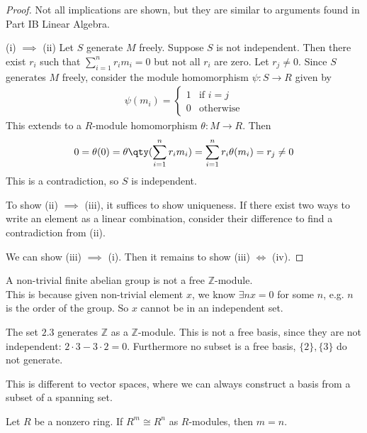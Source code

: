 \begin{proof}
	Not all implications are shown, but they are similar to arguments found in Part IB Linear Algebra.

	(i) $\implies$ (ii)
	Let $S$ generate $M$ freely.
	Suppose $S$ is not independent.
	Then there exist $r_i$ such that $\sum_{i=1}^n r_i m_i = 0$ but not all $r_i$ are zero.
	Let $r_j \neq 0$.
	Since $S$ generates $M$ freely, consider the module homomorphism $\psi : S \to R$ given by
	\begin{align*}
		\psi(m_i) = \begin{cases}
			1 & \text{if } i = j \\
			0 & \text{otherwise}
		\end{cases}
	\end{align*}
	This extends to a $R$-module homomorphism $\theta : M \to R$.
	Then
	\begin{align*}
		0 = \theta(0) = \theta\qty(\sum_{i=1}^n r_i m_i) = \sum_{i=1}^n r_i \theta(m_i) = r_j \neq 0
	\end{align*}
	This is a contradiction, so $S$ is independent.

	To show (ii) $\implies$ (iii), it suffices to show uniqueness.
	If there exist two ways to write an element as a linear combination, consider their difference to find a contradiction from (ii).

	We can show (iii) $\implies$ (i).
	Then it remains to show (iii) $\iff$ (iv).
\end{proof}

\begin{example}
	A non-trivial finite abelian group is not a free $\mathbb Z$-module. \\
	This is because given non-trivial element $x$, we know $\exists nx = 0$ for some $n$, e.g. $n$ is the order of the group.
	So $x$ cannot be in an independent set.
\end{example}

\begin{example}
	The set $\qty{2,3}$ generates $\mathbb Z$ as a $\mathbb Z$-module.
	This is not a free basis, since they are not independent: $2 \cdot 3 - 3 \cdot 2 = 0$.
	Furthermore no subset is a free basis, $\{2\}, \{3\}$ do not generate.

	This is different to vector spaces, where we can always construct a basis from a subset of a spanning set.
\end{example} 

\begin{proposition} \label{prp:15.3}
	Let $R$ be a nonzero ring.
	If $R^m \cong R^n$ as $R$-modules, then $m = n$.
\end{proposition}

